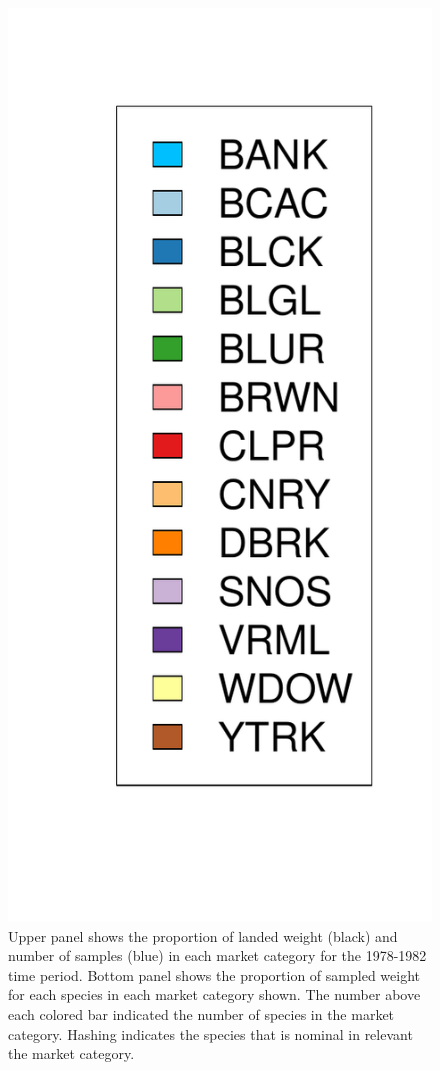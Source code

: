 \documentclass[12pt]{article}
\begin{document}
\begin{landscape}
\begin{figure}[h!]
\includegraphics[height=0.8\textheight]{./pictures/barplotLegend.pdf}
\caption{Upper panel shows the proportion of landed weight (black) and number of 
samples (blue) in each market category for the 1978-1982 time period. Bottom panel 
shows the proportion of sampled weight for each species in each market category 
shown. The number above each colored bar indicated the number of species in 
the market category. Hashing indicates the species that is nominal in relevant 
the market category.}
\label{bar78}
\end{figure}
\end{landscape}
\end{document}
